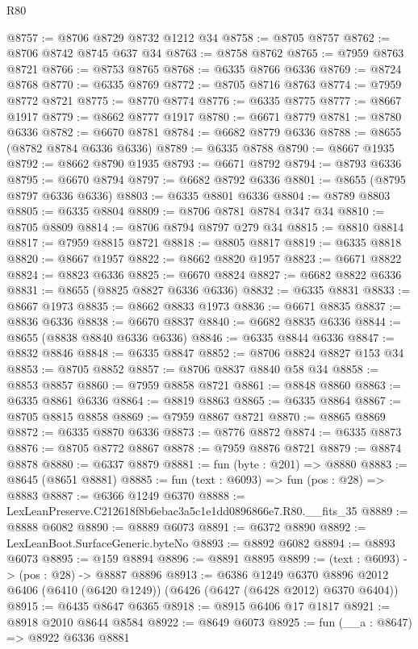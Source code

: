 \begin{lexlean}{R80}
\begin{coremodule}
@8757 := @8706 @8729 @8732 @1212 @34
@8758 := @8705 @8757
@8762 := @8706 @8742 @8745 @637 @34
@8763 := @8758 @8762
@8765 := @7959 @8763 @8721
@8766 := @8753 @8765
@8768 := @6335 @8766 @6336
@8769 := @8724 @8768
@8770 := @6335 @8769
@8772 := @8705 @8716 @8763
@8774 := @7959 @8772 @8721
@8775 := @8770 @8774
@8776 := @6335 @8775
@8777 := @8667 @1917
@8779 := @8662 @8777 @1917
@8780 := @6671 @8779
@8781 := @8780 @6336
@8782 := @6670 @8781
@8784 := @6682 @8779 @6336
@8788 := @8655 (@8782 @8784 @6336 @6336)
@8789 := @6335 @8788
@8790 := @8667 @1935
@8792 := @8662 @8790 @1935
@8793 := @6671 @8792
@8794 := @8793 @6336
@8795 := @6670 @8794
@8797 := @6682 @8792 @6336
@8801 := @8655 (@8795 @8797 @6336 @6336)
@8803 := @6335 @8801 @6336
@8804 := @8789 @8803
@8805 := @6335 @8804
@8809 := @8706 @8781 @8784 @347 @34
@8810 := @8705 @8809
@8814 := @8706 @8794 @8797 @279 @34
@8815 := @8810 @8814
@8817 := @7959 @8815 @8721
@8818 := @8805 @8817
@8819 := @6335 @8818
@8820 := @8667 @1957
@8822 := @8662 @8820 @1957
@8823 := @6671 @8822
@8824 := @8823 @6336
@8825 := @6670 @8824
@8827 := @6682 @8822 @6336
@8831 := @8655 (@8825 @8827 @6336 @6336)
@8832 := @6335 @8831
@8833 := @8667 @1973
@8835 := @8662 @8833 @1973
@8836 := @6671 @8835
@8837 := @8836 @6336
@8838 := @6670 @8837
@8840 := @6682 @8835 @6336
@8844 := @8655 (@8838 @8840 @6336 @6336)
@8846 := @6335 @8844 @6336
@8847 := @8832 @8846
@8848 := @6335 @8847
@8852 := @8706 @8824 @8827 @153 @34
@8853 := @8705 @8852
@8857 := @8706 @8837 @8840 @58 @34
@8858 := @8853 @8857
@8860 := @7959 @8858 @8721
@8861 := @8848 @8860
@8863 := @6335 @8861 @6336
@8864 := @8819 @8863
@8865 := @6335 @8864
@8867 := @8705 @8815 @8858
@8869 := @7959 @8867 @8721
@8870 := @8865 @8869
@8872 := @6335 @8870 @6336
@8873 := @8776 @8872
@8874 := @6335 @8873
@8876 := @8705 @8772 @8867
@8878 := @7959 @8876 @8721
@8879 := @8874 @8878
@8880 := @6337 @8879
@8881 := fun (byte : @201) => @8880
@8883 := @8645 (@8651 @8881)
@8885 := fun (text : @6093) => fun (pos : @28) => @8883
@8887 := @6366 @1249 @6370
@8888 := LexLeanPreserve.C212618f8b6ebac3a5c1e1dd0896866e7.R80.__fits_35
@8889 := @8888 @6082
@8890 := @8889 @6073
@8891 := @6372 @8890
@8892 := LexLeanBoot.SurfaceGeneric.byteNo
@8893 := @8892 @6082
@8894 := @8893 @6073
@8895 := @159 @8894
@8896 := @8891 @8895
@8899 := (text : @6093) -> (pos : @28) -> @8887 @8896
@8913 := @6386
    @1249
    @6370
    @8896
    @2012
    @6406
    (@6410 (@6420 @1249))
    (@6426 (@6427 (@6428 @2012) @6370 @6404))
@8915 := @6435 @8647 @6365
@8918 := @8915 @6406 @17 @1817
@8921 := @8918 @2010 @8644 @8584
@8922 := @8649 @6073
@8925 := fun (__a : @8647) => @8922 @6336 @8881

\end{coremodule}
\end{lexlean}
